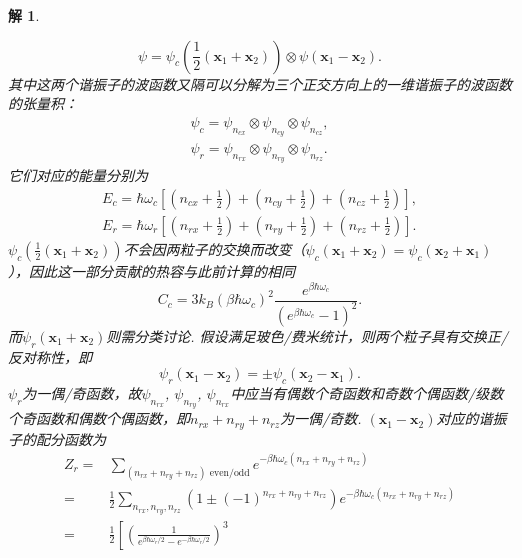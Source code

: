 \documentclass[UTF8,10pt,a4paper]{article}
\theoremstyle{Problem}
\theoremstyle{Solution}
\newtheorem*{sol}{解}
\begin{document}
\begin{sol}
\begin{itemize}
            \begin{equation}
                \psi=\psi_c(\frac{1}{2}(\bm{x}_1+\bm{x}_2))\otimes\psi(\bm{x}_1-\bm{x}_2).
            \end{equation}
        其中这两个谐振子的波函数又隔可以分解为三个正交方向上的一维谐振子的波函数的张量积：
        \begin{gather}
            \psi_c=\psi_{n_{cx}}\otimes\psi_{n_{cy}}\otimes\psi_{n_{cz}},\\
            \psi_r=\psi_{n_{rx}}\otimes\psi_{n_{ry}}\otimes\psi_{n_{rz}}.
        \end{gather}
        它们对应的能量分别为
        \begin{gather}
            E_c=\hbar\omega_c\left[\left(n_{cx}+\frac{1}{2}\right)+\left(n_{cy}+\frac{1}{2}\right)+\left(n_{cz}+\frac{1}{2}\right)\right],\\
            E_r=\hbar\omega_r\left[\left(n_{rx}+\frac{1}{2}\right)+\left(n_{ry}+\frac{1}{2}\right)+\left(n_{rz}+\frac{1}{2}\right)\right].
        \end{gather}
        $\psi_c(\frac{1}{2}(\bm{x}_1+\bm{x}_2))$不会因两粒子的交换而改变（$\psi_c(\bm{x}_1+\bm{x}_2)=\psi_c(\bm{x}_2+\bm{x}_1)$），因此这一部分贡献的热容与此前计算的相同
        \begin{equation}
            C_c=3k_B(\beta\hbar\omega_c)^2\frac{e^{\beta\hbar\omega_c}}{(e^{\beta\hbar\omega_c}-1)^2}.
        \end{equation}
        而$\psi_r(\bm{x}_1+\bm{x}_2)$则需分类讨论.
        假设满足玻色/费米统计，则两个粒子具有交换正/反对称性，即
        \begin{equation}
            \psi_r(\bm{x}_1-\bm{x}_2)=\pm\psi_c(\bm{x}_2-\bm{x}_1).
        \end{equation}
        $\psi_r$为一偶/奇函数，故$\psi_{n_{rx}}$, $\psi_{n_{ry}}$, $\psi_{n_{rx}}$中应当有偶数个奇函数和奇数个偶函数/级数个奇函数和偶数个偶函数，即$n_{rx}+n_{ry}+n_{rz}$为一偶/奇数. $(\bm{x}_1-\bm{x}_2)$对应的谐振子的配分函数为
        \begin{align}
            \nonumber Z_r=&\sum_{(n_{rx}+n_{ry}+n_{rz})\text{ even/odd}}e^{-\beta\hbar\omega_c(n_{rx}+n_{ry}+n_{rz})}\\
            \nonumber=&\frac{1}{2}\sum_{n_{rx},n_{ry},n_{rz}}(1\pm(-1)^{n_{rx}+n_{ry}+n_{rz}})e^{-\beta\hbar\omega_c(n_{rx}+n_{ry}+n_{rz})}\\
            \nonumber=&\frac{1}{2}\left[\left(\frac{1}{e^{\beta\hbar\omega_r/2}-e^{-\beta\hbar\omega_r/2}}\right)^3\right.\\

\end{align}
\end{itemize}
\end{sol}
\end{document}
